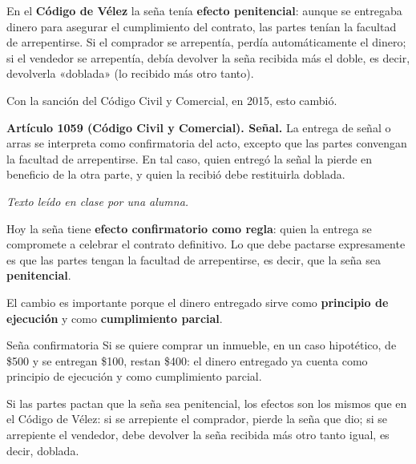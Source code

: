 \documentclass[12pt,oneside]{book}
\begin{document}
En el \textbf{Código de Vélez} la seña tenía \textbf{efecto penitencial}: aunque se entregaba dinero para asegurar el cumplimiento del contrato, las partes tenían la facultad de arrepentirse. Si el comprador se arrepentía, perdía automáticamente el dinero; si el vendedor se arrepentía, debía devolver la seña recibida más el doble, es decir, devolverla «doblada» (lo recibido más otro tanto).

Con la sanción del Código Civil y Comercial, en 2015, esto cambió.

\begin{note}
\textbf{Artículo 1059 (Código Civil y Comercial). Señal.} La entrega de señal o arras se interpreta como confirmatoria del acto, excepto que las partes convengan la facultad de arrepentirse. En tal caso, quien entregó la señal la pierde en beneficio de la otra parte, y quien la recibió debe restituirla doblada.

\emph{Texto leído en clase por una alumna.}
\end{note}

Hoy la seña tiene \textbf{efecto confirmatorio como regla}: quien la entrega se compromete a celebrar el contrato definitivo. Lo que debe pactarse expresamente es que las partes tengan la facultad de arrepentirse, es decir, que la seña sea \textbf{penitencial}.

El cambio es importante porque el dinero entregado sirve como \textbf{principio de ejecución} y como \textbf{cumplimiento parcial}.

\begin{example}{Seña confirmatoria}
Si se quiere comprar un inmueble, en un caso hipotético, de \$500 y se entregan \$100, restan \$400: el dinero entregado ya cuenta como principio de ejecución y como cumplimiento parcial.
\end{example}

Si las partes pactan que la seña sea penitencial, los efectos son los mismos que en el Código de Vélez: si se arrepiente el comprador, pierde la seña que dio; si se arrepiente el vendedor, debe devolver la seña recibida más otro tanto igual, es decir, doblada.
\end{document}
